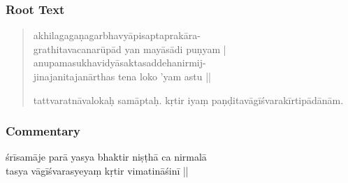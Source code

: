 \documentclass[12pt]{article}
\begin{document}
\subsubsection{Root Text}
\begin{quote}
	akhilagagaṇagarbhavyāpisaptaprakāra-\footnoteB{
		°saptaprakāra°] \EDD ; °sarvaprakāra° \MS
	}\\
	grathitavacanarūpād yan mayāsādi puṇyam |\\
	anupamasukhavidyāsaktasaddehanirmij-\\
	jinajanitajanārthas tena loko 'yam astu ||

	tattvaratnāvalokaḥ samāptaḥ. kṛtir iyaṃ paṇḍitavāgīśvarakīrtipādānām.\\

% 
\end{quote}

\subsubsection{Commentary}
\setlength\parindent{0pt}
śrīsamāje parā yasya bhaktir niṣṭhā ca nirmalā\\
tasya vāgīśvarasyeyaṃ kṛtir vimatināśinī\footnoteB{
	vimatināśinī] \EDD ; vimatināsanī \MS
} ||\\

% 
% 
 
\end{document}
